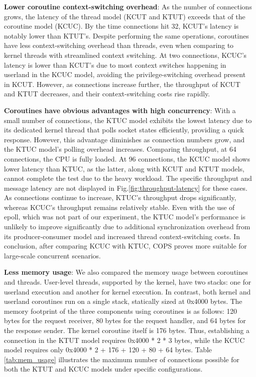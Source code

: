 \documentclass[conference]{IEEEtran}
\begin{document}
\textbf{Lower coroutine context-switching overhead}: As the number of connections grows, the latency of the thread model (KCUT and KTUT) exceeds that of the coroutine model (KCUC). By the time connections hit 32, KCUT's latency is notably lower than KTUT's. Despite performing the same operations, coroutines have less context-switching overhead than threads, even when comparing to kernel threads with streamlined context switching. At two connections, KCUC's latency is lower than KCUT's due to most context switches happening in userland in the KCUC model, avoiding the privilege-switching overhead present in KCUT. However, as connections increase further, the throughput of KCUT and KTUT decreases, and their context-switching costs rise rapidly.

\textbf{Coroutines have obvious advantages with high concurrency}: With a small number of connections, the KTUC model exhibits the lowest latency due to its dedicated kernel thread that polls socket states efficiently, providing a quick response. However, this advantage diminishes as connection numbers grow, and the KTUC model's polling overhead increases. Comparing throughput, at 64 connections, the CPU is fully loaded. At 96 connections, the KCUC model shows lower latency than KTUC, as the latter, along with KCUT and KTUT models, cannot complete the test due to the heavy workload. The specific throughput and message latency are not displayed in Fig.\ref{fig:throughput-latency} for these cases. As connections continue to increase, KTUC's throughput drops significantly, whereas KCUC's throughput remains relatively stable. Even with the use of epoll, which was not part of our experiment, the KTUC model's performance is unlikely to improve significantly due to additional synchronization overhead from its producer-consumer model and increased thread context-switching costs. In conclusion, after comparing KCUC with KTUC, COPS proves more suitable for large-scale concurrent scenarios.

\textbf{Less memory usage}: We also compared the memory usage between coroutines and threads. User-level threads, supported by the kernel, have two stacks: one for userland execution and another for kernel execution. In contrast, both kernel and userland coroutines run on a single stack, statically sized at 0x4000 bytes. The memory footprint of the three components using coroutines is as follows: 120 bytes for the request receiver, 80 bytes for the request handler, and 64 bytes for the response sender. The kernel coroutine itself is 176 bytes. Thus, establishing a connection in the KTUT model requires 0x4000 * 2 * 3 bytes, while the KCUC model requires only 0x4000 * 2 + 176 + 120 + 80 + 64 bytes. Table \ref{tab:mem_usage} illustrates the maximum number of connections possible for both the KTUT and KCUC models under specific configurations.
\end{document}
